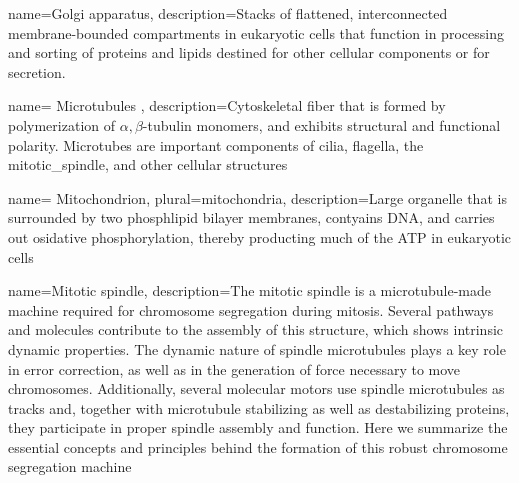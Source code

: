  {
	name={Golgi apparatus},
	description={Stacks of flattened, interconnected membrane-bounded compartments in eukaryotic cells that function in processing and sorting of proteins and lipids destined for other cellular components or for secretion.\cite{lodish2003molecular}}}



 {
	name= {Microtubules} ,
	description={Cytoskeletal fiber that is formed by polymerization of $\alpha,\beta$-tubulin monomers, and exhibits structural and functional polarity. Microtubes are important components of cilia, flagella, the \gls{mitotic_spindle}, and other cellular structures\cite{lodish2003molecular}}}


 {
	name= {Mitochondrion},
	plural={mitochondria},
	description={Large \gls{organelle} that is surrounded by two phosphlipid bilayer membranes, contyains DNA, and carries out osidative phosphorylation, thereby producting much of the \gls{ATP} in eukaryotic cells\cite{lodish2003molecular} }}


 {
	name={Mitotic spindle},
	description={The mitotic spindle is a microtubule-made machine required for chromosome segregation during mitosis. Several pathways and molecules contribute to the assembly of this structure, which shows intrinsic dynamic properties. The dynamic nature of spindle microtubules plays a key role in error correction, as well as in the generation of force necessary to move chromosomes. Additionally, several molecular motors use spindle microtubules as tracks and, together with microtubule stabilizing as well as destabilizing proteins, they participate in proper spindle assembly and function. Here we summarize the essential concepts and principles behind the formation of this robust chromosome segregation machine\cite{bradshaw2015encyclopedia}}}

